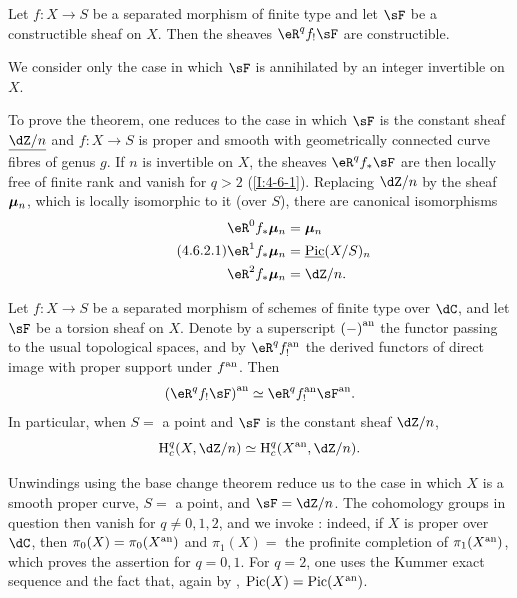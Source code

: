 \begin{theorem}\label{I:4-6-2}
Let $f:X\to S$ be a separated morphism of finite type and let $\sF$ be
a constructible sheaf on $X$. Then the sheaves $\eR^qf_!\sF$ are
constructible.
\end{theorem}

We consider only the case in which $\sF$ is annihilated by an integer
invertible on $X$.

To prove the theorem, one reduces to the case in which $\sF$ is the
constant sheaf $\const{\dZ/n}$ and $f:X\to S$ is proper and smooth with
geometrically connected curve fibres of genus $g$. If $n$ is invertible
on $X$, the sheaves $\eR^qf_*\sF$ are then locally free of finite rank
and vanish for $q>2$ (\ref{I:4-6-1}). Replacing $\dZ/n$ by the sheaf
${\bm\mu}_n$, which is locally isomorphic to it (over $S$), there are
canonical isomorphisms
\begin{equation*}\tag{4.6.2.1}\label{I:eq:4-6-2-1}
\begin{aligned}
  \eR^0 f_* \dmu_n &= \dmu_n \\
  \eR^1 f_* \dmu_n &= \const\pic(X/S)_n \\
  \eR^2 f_* \dmu_n &= \dZ/n \text{.}
\end{aligned}
\end{equation*}

\begin{theorem}\label{I:4-6-3}
Let $f:X\to S$ be a separated morphism of schemes of finite type over
$\dC$, and let $\sF$ be a torsion sheaf on $X$. Denote by a superscript
${(-)}^{\textnormal{an}}$ the functor passing to the usual topological spaces, and by
$\eR^q\an f_!$ the derived functors of direct image with proper support
under ${f}^{\textnormal{an}}$. Then
\[
  \an{(\eR^q f_! \sF)} \simeq \eR^q \an f_! \an \sF \text{.}
\]
In particular, when $S=$ a point and $\sF$ is the constant sheaf
$\dZ/n$,
\[
  \h_c^q(X,\dZ/n) \simeq \h_c^q(\an X,\dZ/n)\text{.}
\]
\end{theorem}

Unwindings using the base change theorem reduce us to the case in which
$X$ is a smooth proper curve, $S=$ a point, and $\sF=\dZ/n$. The
cohomology groups in question then vanish for $q\ne0,1,2$, and we invoke
\cite{se55}: indeed, if $X$ is proper over $\dC$, then
$\pi_0(X)=\pi_0({X}^{\textnormal{an}})$ and $\pi_1(X)=$ the profinite completion of
$\pi_1({X}^{\textnormal{an}})$, which proves the assertion for $q=0,1$. For $q=2$,
one uses the Kummer exact sequence and the fact that, again by
\cite{se55}, $\operatorname{Pic}(X)=\operatorname{Pic}({X}^{\textnormal{an}})$.

